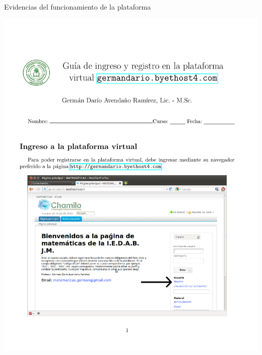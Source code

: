 \documentclass{beamer}
\begin{document}
\begin{frame}{Evidencias del funcionamiento de la plataforma}
\begin{center}
\includegraphics[scale=.4,trim=1cm 2.75cm 1cm 2.75cm,clip]{Images/GuiaIngresPlataforma1.pdf} 
\end{center}\end{frame}
\end{document}
